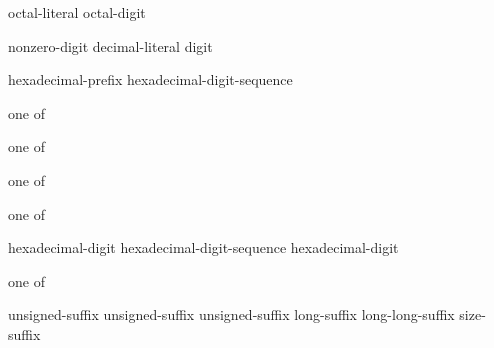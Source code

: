 \begin{bnf}
\br
    \br
    octal-literal  octal-digit
\end{bnf}

\begin{bnf}
\br
    nonzero-digit\br
    decimal-literal  digit
\end{bnf}

\begin{bnf}
\br
    hexadecimal-prefix hexadecimal-digit-sequence
\end{bnf}

\begin{bnf}
 \textnormal{one of}\br
\end{bnf}

\begin{bnf}
 \textnormal{one of}\br
\end{bnf}

\begin{bnf}
 \textnormal{one of}\br
\end{bnf}

\begin{bnf}
 \textnormal{one of}\br
\end{bnf}

\begin{bnf}
\br
    hexadecimal-digit\br
    hexadecimal-digit-sequence  hexadecimal-digit
\end{bnf}

\begin{bnf}
 \textnormal{one of}\br
    \br
    \br
\end{bnf}

\begin{bnf}
\br
    unsigned-suffix  \br
    unsigned-suffix  \br
    unsigned-suffix  \br
    long-suffix  \br
    long-long-suffix  \br
    size-suffix 
\end{bnf}

